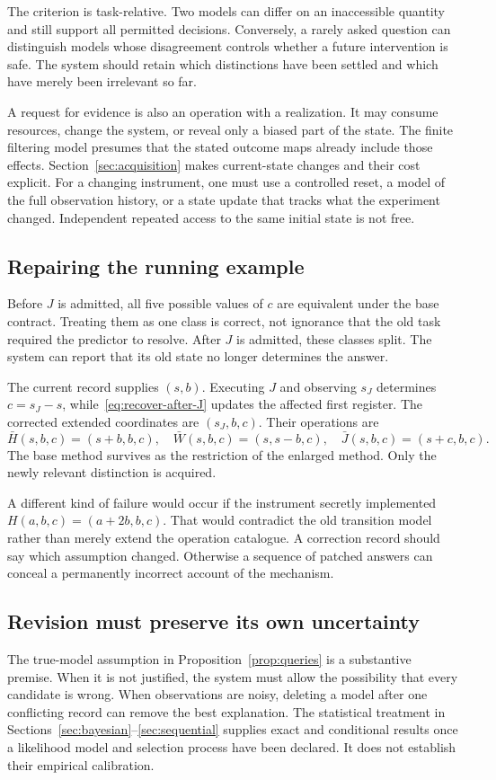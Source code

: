 \documentclass[11pt,letterpaper]{article}
\theoremstyle{plain}
\theoremstyle{definition}
\begin{document}
The criterion is task-relative. Two models can differ on an inaccessible quantity and still support all permitted decisions. Conversely, a rarely asked question can distinguish models whose disagreement controls whether a future intervention is safe. The system should retain which distinctions have been settled and which have merely been irrelevant so far.

A request for evidence is also an operation with a realization. It may consume resources, change the system, or reveal only a biased part of the state. The finite filtering model presumes that the stated outcome maps already include those effects. Section~\ref{sec:acquisition} makes current-state changes and their cost explicit. For a changing instrument, one must use a controlled reset, a model of the full observation history, or a state update that tracks what the experiment changed. Independent repeated access to the same initial state is not free.

\subsection{Repairing the running example}
Before $J$ is admitted, all five possible values of $c$ are equivalent under the base contract. Treating them as one class is correct, not ignorance that the old task required the predictor to resolve. After $J$ is admitted, these classes split. The system can report that its old state no longer determines the answer.

The current record supplies $(s,b)$. Executing $J$ and observing $s_J$ determines $c=s_J-s$, while~\eqref{eq:recover-after-J} updates the affected first register. The corrected extended coordinates are $(s_J,b,c)$. Their operations are
\[
\bar H(s,b,c)=(s+b,b,c),\quad
\bar W(s,b,c)=(s,s-b,c),\quad
\bar J(s,b,c)=(s+c,b,c).
\]
The base method survives as the restriction of the enlarged method. Only the newly relevant distinction is acquired.

A different kind of failure would occur if the instrument secretly implemented $H(a,b,c)=(a+2b,b,c)$. That would contradict the old transition model rather than merely extend the operation catalogue. A correction record should say which assumption changed. Otherwise a sequence of patched answers can conceal a permanently incorrect account of the mechanism.

\subsection{Revision must preserve its own uncertainty}
The true-model assumption in Proposition~\ref{prop:queries} is a substantive premise. When it is not justified, the system must allow the possibility that every candidate is wrong. When observations are noisy, deleting a model after one conflicting record can remove the best explanation. The statistical treatment in Sections~\ref{sec:bayesian}--\ref{sec:sequential} supplies exact and conditional results once a likelihood model and selection process have been declared. It does not establish their empirical calibration.
\end{document}
